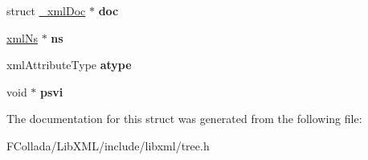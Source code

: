 \begin{DoxyCompactItemize}
\item 
\hypertarget{struct__xmlAttr_ab2eb84cdffefadddcc48fc33b7ca2d75}{
struct \hyperlink{struct__xmlDoc}{\_\-xmlDoc} $\ast$ {\bfseries doc}}
\label{struct__xmlAttr_ab2eb84cdffefadddcc48fc33b7ca2d75}

\item 
\hypertarget{struct__xmlAttr_a065c43de84bfa24525a9d2b971cf0fae}{
\hyperlink{struct__xmlNs}{xmlNs} $\ast$ {\bfseries ns}}
\label{struct__xmlAttr_a065c43de84bfa24525a9d2b971cf0fae}

\item 
\hypertarget{struct__xmlAttr_a95fc30b9d2f4df9ffc8ee24d5926c63c}{
xmlAttributeType {\bfseries atype}}
\label{struct__xmlAttr_a95fc30b9d2f4df9ffc8ee24d5926c63c}

\item 
\hypertarget{struct__xmlAttr_a6b5d144ded807d5384ab9ad4cf129454}{
void $\ast$ {\bfseries psvi}}
\label{struct__xmlAttr_a6b5d144ded807d5384ab9ad4cf129454}

\end{DoxyCompactItemize}


The documentation for this struct was generated from the following file:\begin{DoxyCompactItemize}
\item 
FCollada/LibXML/include/libxml/tree.h\end{DoxyCompactItemize}
